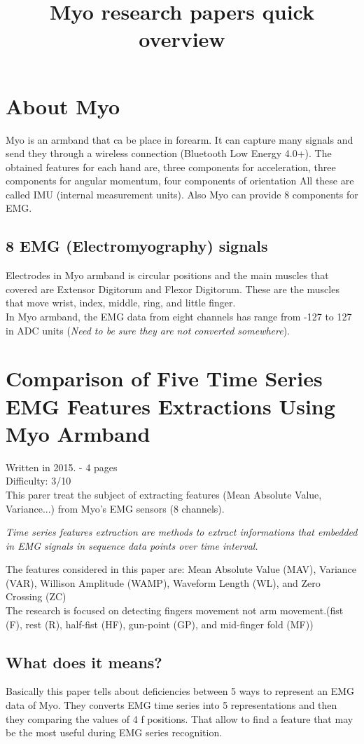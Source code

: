\documentclass{article}
\title{Myo research papers quick overview}
\begin{document}
\section{About Myo}

Myo is an armband that ca be place in forearm. It can capture many signals and send they through a wireless connection (Bluetooth Low Energy 4.0+).
The obtained features for each hand are, three components for acceleration, three components for angular momentum, four components of orientation All these are called IMU (internal measurement units).  Also Myo can provide 8 components for EMG.
\subsection{ 8 EMG (Electromyography) signals}
Electrodes in Myo armband is circular positions and the
main muscles that covered are Extensor Digitorum and Flexor
Digitorum. These are the muscles that move wrist, index,
middle, ring, and little finger.\\
In Myo armband, the EMG data from eight channels has
range from -127 to 127 in ADC units (\emph{Need to be sure they are not converted somewhere}).

\section{Comparison of Five Time Series EMG Features Extractions Using Myo Armband}
Written in 2015. - 4 pages\\
Difficulty: 3/10\\
This parer treat the subject of extracting features (Mean Absolute Value, Variance...) from Myo's EMG sensors (8 channels).
\begin{center}
\textit{Time series features extraction
are methods to extract informations that embedded in EMG
signals in sequence data points over time interval.}
\end{center}
The features considered in this paper are: Mean Absolute Value
(MAV), Variance (VAR), Willison Amplitude (WAMP), Waveform
Length (WL), and Zero Crossing (ZC)\\

The research is focused on detecting fingers movement not arm movement.(fist (F), rest (R), half-fist (HF), gun-point (GP), and mid-finger fold (MF))

\subsection{What does it means?}
Basically this paper tells about deficiencies between 5 ways to represent an EMG data of Myo. They converts EMG time series into 5 representations and then they comparing the values of 4 f positions. That allow to find a feature that may be the most useful during EMG series recognition. 
\end{document}
